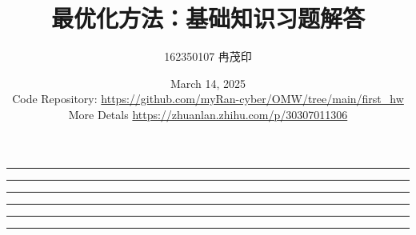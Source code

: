 \documentclass[UTF8]{ctexart}
\title{最优化方法：基础知识习题解答}
\author{162350107 冉茂印}
\date{March 14, 2025 \\ Code Repository: \url{https://github.com/myRan-cyber/OMW/tree/main/first_hw} 
 \\ More Detals \url{https://zhuanlan.zhihu.com/p/30307011306}}
\begin{document}
\maketitle



\vspace{1em}
\rule{17cm}{2pt}



\vspace{1em}
\rule{17cm}{2pt}


\vspace{1em}
\rule{17cm}{2pt}


\vspace{1em}
\rule{17cm}{2pt}


\vspace{1em}
\rule{17cm}{2pt}


\vspace{1em}
\rule{17cm}{2pt}

\end{document}
